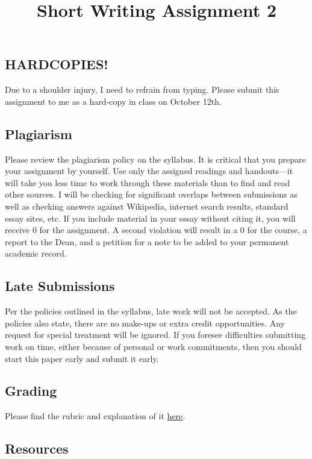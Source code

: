 \documentclass[]{article}
\title{Short Writing Assignment 2}
\date{}
\begin{document}
\maketitle

\subsection{HARDCOPIES!}\label{hardcopies}

Due to a shoulder injury, I need to refrain from typing. Please submit
this assignment to me as a hard-copy in class on October 12th.

\subsection{Plagiarism}\label{plagiarism}

Please review the plagiarism policy on the syllabus. It is critical that
you prepare your assignment by yourself. Use only the assigned readings
and handouts---it will take you less time to work through these
materials than to find and read other sources. I will be checking for
significant overlaps between submissions as well as checking answers
against Wikipedia, internet search results, standard essay sites, etc.
If you include material in your essay without citing it, you will
receive 0 for the assignment. A second violation will result in a 0 for
the course, a report to the Dean, and a petition for a note to be added
to your permanent academic record.

\subsection{Late Submissions}\label{late-submissions}

Per the policies outlined in the syllabus, late work will not be
accepted. As the policies also state, there are no make-ups or extra
credit opportunities. Any request for special treatment will be ignored.
If you foresee difficulties submitting work on time, either because of
personal or work commitments, then you should start this paper early and
submit it early.

\subsection{Grading}\label{grading}

Please find the rubric and explanation of it
\href{/Teaching/Grading/}{here}.

\subsection{Resources}\label{resources}
\end{document}
